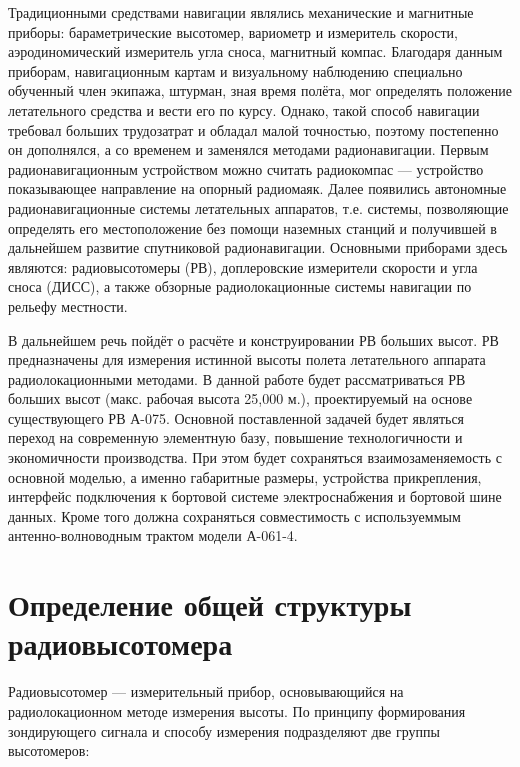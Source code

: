 \documentclass[utf8x, 14pt, oneside, a4paper]{article}
\begin{document}
		Традиционными средствами навигации являлись механические и магнитные приборы: бараметрические высотомер, вариометр и измеритель скорости, аэродиномический измеритель угла сноса, магнитный компас. Благодаря данным приборам, навигационным картам и визуальному наблюдению специально обученный член экипажа, штурман, зная время полёта, мог определять положение летательного средства и вести его по курсу. Однако, такой способ навигации требовал больших трудозатрат и обладал малой точностью, поэтому постепенно он дополнялся, а со временем и заменялся методами радионавигации. Первым радионавигационным устройством можно считать радиокомпас --- устройство показывающее направление на опорный радиомаяк. Далее появились автономные радионавигационные системы летательных аппаратов, т.е. системы, позволяющие определять его местоположение без помощи наземных станций и получившей в дальнейшем развитие спутниковой радионавигации. Основными приборами здесь являются: радиовысотомеры (РВ), доплеровские измерители скорости и угла сноса (ДИСС), а также обзорные радиолокационные системы навигации по рельефу местности.
		
		В дальнейшем речь пойдёт о расчёте и конструировании РВ больших высот. РВ предназначены для измерения истинной высоты полета летательного аппарата радиолокационными методами. В данной работе будет рассматриваться РВ больших высот (макс. рабочая высота 25,000 м.), проектируемый на основе существующего РВ А-075. Основной поставленной задачей будет являться переход на современную элементную базу, повышение технологичности и экономичности производства. При этом будет сохраняться взаимозаменяемость с основной моделью, а именно габаритные размеры, устройства прикрепления, интерфейс подключения к бортовой системе электроснабжения и бортовой шине данных. Кроме того должна сохраняться совместимость с используеммым антенно-волноводным трактом модели А-061-4.
	
	\pagebreak
		
	
	
	\titleformat{\section}[block]
	{\normalsize\bfseries}{\thesection}{1em}{}
	
	\section{Определение общей структуры радиовысотомера}
		Радиовысотомер --- измерительный прибор, основывающийся на радиолокационном методе измерения высоты. По принципу формирования зондирующего сигнала и способу измерения подразделяют две группы высотомеров:
		
\end{document}
